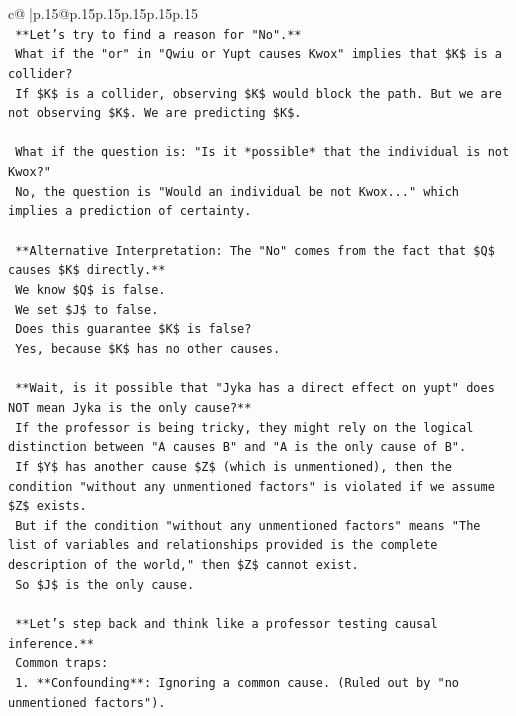 \documentclass{article}
\begin{document}
{\begin{supertabular}{c@{$\;$}|p{.15\linewidth}@{}p{.15\linewidth}p{.15\linewidth}p{.15\linewidth}p{.15\linewidth}p{.15\linewidth}}
{{{\\ 
\texttt{        **Let's try to find a reason for "No".**} \\
\texttt{        What if the "or" in "Qwiu or Yupt causes Kwox" implies that \$K\$ is a collider?} \\
\texttt{        If \$K\$ is a collider, observing \$K\$ would block the path. But we are not observing \$K\$. We are predicting \$K\$.} \\
\\ 
\texttt{        What if the question is: "Is it *possible* that the individual is not Kwox?"} \\
\texttt{        No, the question is "Would an individual be not Kwox..." which implies a prediction of certainty.} \\
\\ 
\texttt{        **Alternative Interpretation: The "No" comes from the fact that \$Q\$ causes \$K\$ directly.**} \\
\texttt{        We know \$Q\$ is false.} \\
\texttt{        We set \$J\$ to false.} \\
\texttt{        Does this guarantee \$K\$ is false?} \\
\texttt{        Yes, because \$K\$ has no other causes.} \\
\\ 
\texttt{        **Wait, is it possible that "Jyka has a direct effect on yupt" does NOT mean Jyka is the only cause?**} \\
\texttt{        If the professor is being tricky, they might rely on the logical distinction between "A causes B" and "A is the only cause of B".} \\
\texttt{        If \$Y\$ has another cause \$Z\$ (which is unmentioned), then the condition "without any unmentioned factors" is violated if we assume \$Z\$ exists.} \\
\texttt{        But if the condition "without any unmentioned factors" means "The list of variables and relationships provided is the complete description of the world," then \$Z\$ cannot exist.} \\
\texttt{        So \$J\$ is the only cause.} \\
\\ 
\texttt{        **Let's step back and think like a professor testing causal inference.**} \\
\texttt{        Common traps:} \\
\texttt{        1.  **Confounding**: Ignoring a common cause. (Ruled out by "no unmentioned factors").} \\
}}}
\end{supertabular}}
\end{document}
